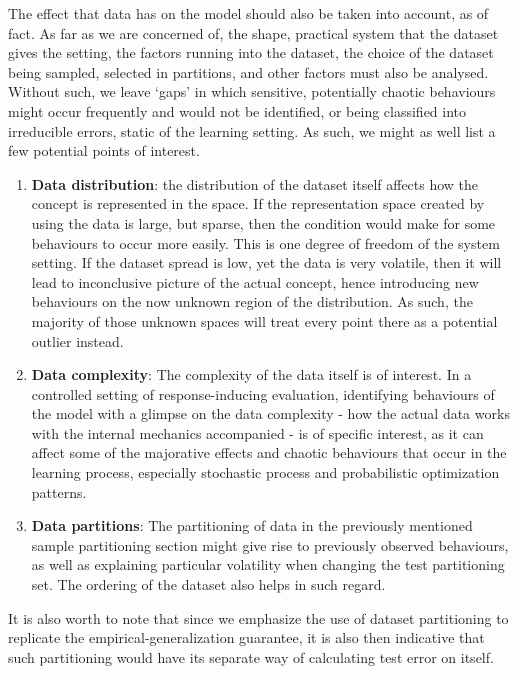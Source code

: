 \documentclass[
  journal=largetwo,
  year=2025,
  volume=37,
]{cup-journal}
\begin{document}
The effect that data has on the model should also be taken into account, as of fact. As far as we are concerned of, the shape, practical system that the dataset gives the setting, the factors running into the dataset, the choice of the dataset being sampled, selected in partitions, and other factors must also be analysed. Without such, we leave `gaps' in which sensitive, potentially chaotic behaviours might occur frequently and would not be identified, or being classified into irreducible errors, static of the learning setting. As such, we might as well list a few potential points of interest. 
\begin{enumerate}[itemsep=1pt,topsep=0.5pt]
  \item \textbf{Data distribution}: the distribution of the dataset itself affects how the concept is represented in the space. If the representation space created by using the data is large, but sparse, then the condition would make for some behaviours to occur more easily. This is one degree of freedom of the system setting. If the dataset spread is low, yet the data is very volatile, then it will lead to inconclusive picture of the actual concept, hence introducing new behaviours on the now unknown region of the distribution. As such, the majority of those unknown spaces will treat every point there as a potential outlier instead. 
  \item \textbf{Data complexity}: The complexity of the data itself is of interest. In a controlled setting of response-inducing evaluation, identifying behaviours of the model with a glimpse on the data complexity - how the actual data works with the internal mechanics accompanied - is of specific interest, as it can affect some of the majorative effects and chaotic behaviours that occur in the learning process, especially stochastic process and probabilistic optimization patterns. 
  \item \textbf{Data partitions}: The partitioning of data in the previously mentioned sample partitioning section might give rise to previously observed behaviours, as well as explaining particular volatility when changing the test partitioning set. The ordering of the dataset also helps in such regard. 
\end{enumerate}
It is also worth to note that since we emphasize the use of dataset partitioning to replicate the empirical-generalization guarantee, it is also then indicative that such partitioning would have its separate way of calculating test error on itself. 
\end{document}

